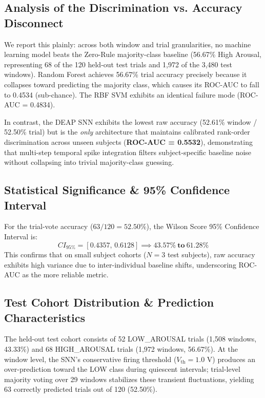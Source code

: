 \documentclass[conference]{IEEEtran}
\begin{document}
\subsection{Analysis of the Discrimination vs. Accuracy Disconnect}
We report this plainly: across both window and trial granularities, no machine learning model beats the Zero-Rule majority-class baseline (56.67\% High Arousal, representing 68 of the 120 held-out test trials and 1,972 of the 3,480 test windows). Random Forest achieves 56.67\% trial accuracy precisely because it collapses toward predicting the majority class, which causes its ROC-AUC to fall to 0.4534 (sub-chance). The RBF SVM exhibits an identical failure mode (ROC-AUC = 0.4834).

In contrast, the DEAP SNN exhibits the lowest raw accuracy (52.61\% window / 52.50\% trial) but is the \textit{only} architecture that maintains calibrated rank-order discrimination across unseen subjects (\textbf{ROC-AUC = 0.5532}), demonstrating that multi-step temporal spike integration filters subject-specific baseline noise without collapsing into trivial majority-class guessing.

\subsection{Statistical Significance \& 95\% Confidence Interval}
For the trial-vote accuracy ($63 / 120 = 52.50\%$), the Wilson Score 95\% Confidence Interval is:
\begin{equation}
CI_{95\%} = [0.4357, \, 0.6128] \implies \mathbf{43.57\% \ \text{to} \ 61.28\%}
\end{equation}
This confirms that on small subject cohorts ($N=3$ test subjects), raw accuracy exhibits high variance due to inter-individual baseline shifts, underscoring ROC-AUC as the more reliable metric.

\subsection{Test Cohort Distribution \& Prediction Characteristics}
The held-out test cohort consists of 52 LOW\_AROUSAL trials (1,508 windows, 43.33\%) and 68 HIGH\_AROUSAL trials (1,972 windows, 56.67\%). At the window level, the SNN's conservative firing threshold ($V_{\text{th}} = 1.0$ V) produces an over-prediction toward the LOW class during quiescent intervals; trial-level majority voting over 29 windows stabilizes these transient fluctuations, yielding 63 correctly predicted trials out of 120 (52.50\%).
\end{document}
